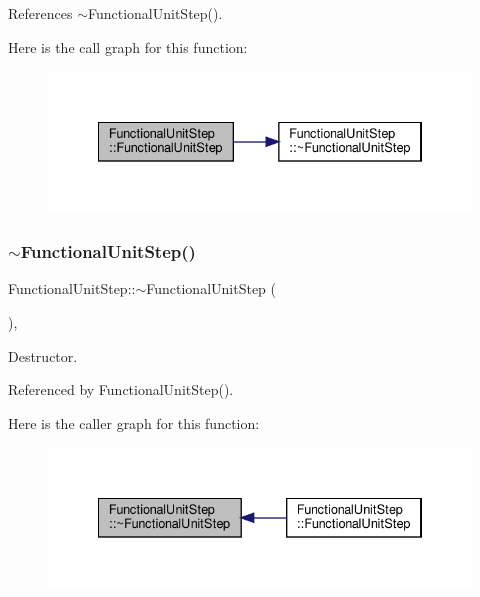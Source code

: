 References $\sim$\+Functional\+Unit\+Step().

Here is the call graph for this function\+:
\nopagebreak
\begin{figure}[H]
\begin{center}
\leavevmode
\includegraphics[width=334pt]{d0/db7/classFunctionalUnitStep_a110c80e9c9c11fc261aa949f19f66b43_cgraph}
\end{center}
\end{figure}
\mbox{\label{classFunctionalUnitStep_ad4fa61a1bc13ff06f21a052763bbb6db}} 
\subsubsection{\texorpdfstring{$\sim$\+Functional\+Unit\+Step()}{~FunctionalUnitStep()}}
{\footnotesize\ttfamily Functional\+Unit\+Step\+::$\sim$\+Functional\+Unit\+Step (\begin{DoxyParamCaption}{ }\end{DoxyParamCaption})\hspace{0.3cm}{\ttfamily [override]}, {\ttfamily [default]}}



Destructor. 



Referenced by Functional\+Unit\+Step().

Here is the caller graph for this function\+:
\nopagebreak
\begin{figure}[H]
\begin{center}
\leavevmode
\includegraphics[width=334pt]{d0/db7/classFunctionalUnitStep_ad4fa61a1bc13ff06f21a052763bbb6db_icgraph}
\end{center}
\end{figure}


